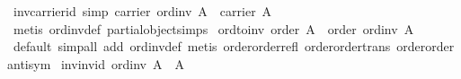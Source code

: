 \begin{isabellebody}
\isanewline
{}\isamarkupfalse%
\ inv{}carrier{}id\ {}simp{}{}\ {}carrier\ {}ord{}inv\ A{}\ {}\ carrier\ A{}\isanewline
%
\isadelimproof
\ \ %
\endisadelimproof
%
\isatagproof
{}\isamarkupfalse%
\ {}metis\ ord{}inv{}def\ partial{}object{}simps{}{}{}{}%
\endisatagproof
{\isafoldproof}%
%
\isadelimproof
\isanewline
%
\endisadelimproof
\isanewline
{}\isamarkupfalse%
\ ord{}to{}inv{}\ {}order\ A\ {}\ order\ {}ord{}inv\ A{}{}\isanewline
%
\isadelimproof
\ \ %
\endisadelimproof
%
\isatagproof
{}\isamarkupfalse%
\ {}default{}\ simp{}all\ add{}\ ord{}inv{}def{}\ {}metis\ order{}order{}refl\ order{}order{}trans\ order{}order{}antisym{}{}{}%
\endisatagproof
{\isafoldproof}%
%
\isadelimproof
\isanewline
%
\endisadelimproof
\isanewline
{}\isamarkupfalse%
\ inv{}inv{}id{}\ {}ord{}inv\ {}A{}{}\ {}\ A{}\isanewline

\end{isabellebody}

